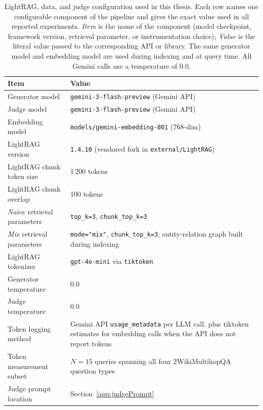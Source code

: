 \documentclass[english, bibtex]{kththesis}               %
\numberwithin{listing}{chapter}
\begin{document}
\begin{table}[!ht]
\centering
\caption{LightRAG, data, and judge configuration used in this thesis. Each row names one configurable component of the pipeline and gives the exact value used in all reported experiments. \emph{Item} is the name of the component (model checkpoint, framework version, retrieval parameter, or instrumentation choice); \emph{Value} is the literal value passed to the corresponding API or library. The same generator model and embedding model are used during indexing and at query time. All Gemini calls use a temperature of $0.0$.}
\label{tab:lightragDataJudgeConfig}
\begin{tabularx}{\textwidth}{p{}|X}
\textbf{Item} & \textbf{Value} \\
\hline
Generator model & \texttt{gemini-3-flash-preview} (Gemini API) \\
Judge model & \texttt{gemini-3-flash-preview} (Gemini API) \\
Embedding model & \texttt{models/gemini-embedding-001} (768-dim) \\
LightRAG version & \texttt{1.4.10} (vendored fork in \texttt{external/LightRAG}) \\
LightRAG chunk token size & 1\,200 tokens \\
LightRAG chunk overlap & 100 tokens \\
\emph{Naive} retrieval parameters & \texttt{top\_k=3}, \texttt{chunk\_top\_k=3} \\
\emph{Mix} retrieval parameters & \texttt{mode="mix"}, \texttt{chunk\_top\_k=3}; entity-relation graph built during indexing \\
LightRAG tokenizer & \texttt{gpt-4o-mini} via \texttt{tiktoken} \\
Generator temperature & 0.0 \\
Judge temperature & 0.0 \\
Token logging method & Gemini API \texttt{usage\_metadata} per LLM call, plus tiktoken estimates for embedding calls when the API does not report tokens \\
Token measurement subset & \(N = 15\) queries spanning all four 2WikiMultihopQA question types \\
Judge prompt location & Section~\ref{app:judgePrompt} \\
\end{tabularx}
\end{table}
\end{document}
